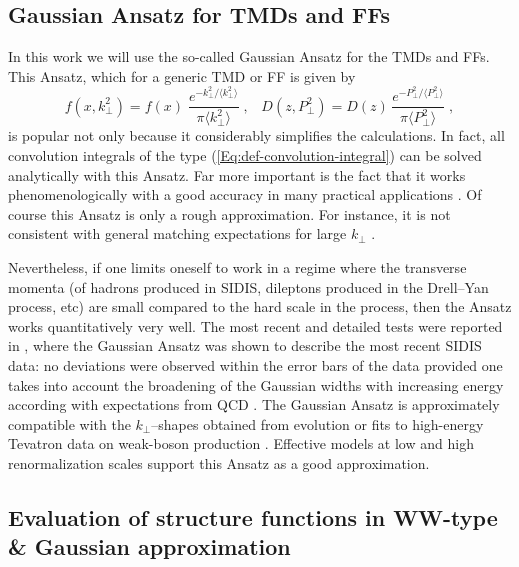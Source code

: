 \documentclass[a4paper,11pt]{article}
\newcommand{\be}{\begin{equation}}
\newcommand{\ee}{\end{equation}}
\newcommand{\la}{\langle}
\newcommand{\ra}{\rangle}
\def\kperp{k_\perp}
\def\pperp{P_\perp}
\def\avkperp{\la \kperp^2 \ra}
\def\avpperp{\la \pperp^2 \ra}
\begin{document}
\subsection{Gaussian Ansatz for TMDs and FFs}
\label{Sec-4.3:evaluation}

In this work we will use the so-called Gaussian Ansatz for the TMDs and FFs.
This Ansatz, which for a generic TMD or FF is given by
\be\label{Eq:Gauss-generic}
    f(x,\kperp^2) = f(x)\;
    \frac{e^{-\kperp^2/\avkperp}}{\pi\avkperp} \;,\;\;\;
    D(z,\pperp^2) = D(z)\,
    \frac{e^{-\pperp^2/\avpperp}}{\pi\avpperp}\;,
\ee
is popular not only because it considerably simplifies the
calculations. In fact, all convolution integrals of the type
(\ref{Eq:def-convolution-integral}) can be solved analytically
with this Ansatz. Far more important is the fact that it works
phenomenologically with a good accuracy in many practical applications
\cite{Anselmino:2005nn,Collins:2005ie,D'Alesio:2007jt,Schweitzer:2010tt,
Signori:2013mda,Anselmino:2013lza}.
Of course this Ansatz is only a rough approximation. For instance,
it is not consistent with general matching expectations for large
$\kperp$ \cite{Bacchetta:2008xw}.

Nevertheless, if one limits oneself to work in a regime where the
transverse momenta (of hadrons produced in SIDIS, dileptons produced
in the Drell--Yan process, etc) are small compared to the hard
scale in the process, then the Ansatz works quantitatively
very well. The most recent and detailed tests were reported in
\cite{Schweitzer:2010tt}, where the Gaussian Ansatz was shown to
describe the most recent SIDIS data: no deviations were observed
within the error bars of the data provided one takes into account
the broadening of the Gaussian widths with increasing energy
\cite{Schweitzer:2010tt} according
with expectations from QCD \cite{Aybat:2011zv}.
The Gaussian Ansatz is approximately compatible with
the $\kperp$--shapes obtained from evolution \cite{Aybat:2011zv}
or fits to high-energy Tevatron data on weak-boson production
\cite{Landry:2002ix}. Effective models at
low \cite{Pasquini:2008ax,Avakian:2010br,Lorce:2011dv} and
high \cite{Efremov:2009ze} renormalization scales support this
Ansatz as a good approximation.

\subsection{Evaluation of structure functions in WW-type \&
 Gaussian approximation}
\label{Sec-4.4:evaluation}
\end{document}
